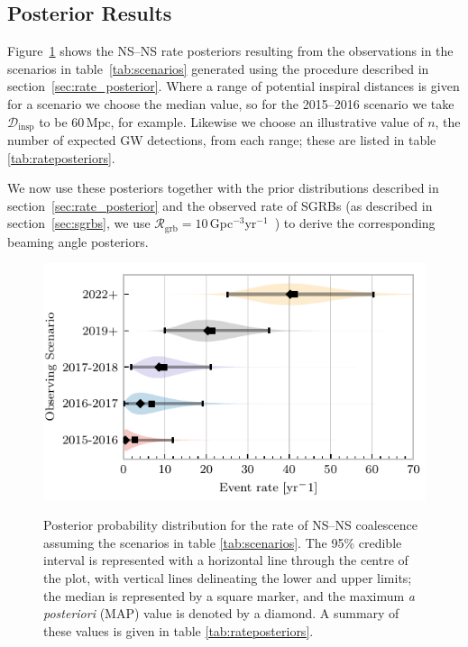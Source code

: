 \documentclass[twocolumn]{aastex61}
\newcommand{\grbrate}{{{\mathcal R}_{\mathrm{grb}}}}
\newcommand{\dinsp}{\ensuremath{{\mathcal D}_{\mathrm{insp}}}}
\newcommand{\latin}[1]{\textit{#1}}
\newcommand{\mpc}{\mathrm{Mpc}}
\newcommand{\BNS}{\ac{NS}--\ac{NS}\xspace}
\begin{document}
\subsection{Posterior Results}
Figure~\ref{fig:aligorate} shows the \BNS rate posteriors resulting
from the observations in the scenarios in table~\ref{tab:scenarios}
generated using the procedure described in
section~\ref{sec:rate_posterior}. Where a range of potential inspiral
distances is given for a scenario we choose the median value, so for
the 2015--2016 scenario we take \dinsp{} to be $60\,\mpc$, for
example. Likewise we choose an illustrative value of $n$, the number
of expected \ac{GW} detections, from each range; these are listed in
table \ref{tab:rateposteriors}.

We now use these posteriors together with the prior distributions
described in section~\ref{sec:rate_posterior} and the observed rate of
\acp{SGRB} (as described in section~\ref{sec:sgrbs}, we use
$\grbrate=10$\,Gpc$^{-3}$yr$^{-1}$~\cite{Nakar:2007yr,Dietz:2010eh})
to derive the corresponding beaming angle posteriors.

\begin{figure}
\centering
{\includegraphics[width=\linewidth]{rate_posteriors_violin.pdf}}
\caption{Posterior probability distribution for the rate of \BNS
    coalescence assuming the scenarios in table \ref{tab:scenarios}.
    The 95\% credible interval is represented with a horizontal line through
    the centre of the plot, with vertical lines delineating the lower and upper limits; the median is represented by a square marker, and the
    maximum \latin{a posteriori} (\ac{MAP}) value is denoted by a diamond. A
    summary of these values is given in table \ref{tab:rateposteriors}.
    \label{fig:aligorate} }
\end{figure}
\end{document}
